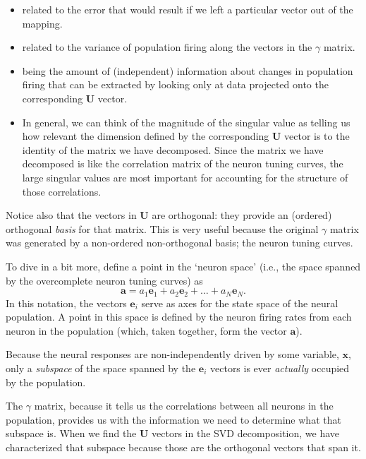 \documentclass[10pt,letterpaper,oneside]{article}
\begin{document}
\begin{itemize}
\item related to the error that would result if we left a particular vector
out of the mapping. 
\item related to the variance of population firing along the vectors in
the $\gamma$ matrix. 
\item being the amount of (independent) information about changes in population
firing that can be extracted by looking only at data projected onto
the corresponding $\mathbf{U}$ vector.
\item In general, we can think of the magnitude of the singular value as
telling us how relevant the dimension defined by the corresponding
$\mathbf{U}$ vector is to the identity of the matrix we have decomposed.
Since the matrix we have decomposed is like the correlation matrix
of the neuron tuning curves, the large singular values are most important
for accounting for the structure of those correlations. 
\end{itemize}

Notice also that the vectors in $\mathbf{U}$ are orthogonal: they
provide an (ordered) orthogonal \emph{basis} for that matrix. This
is very useful because the original \textbf{$\gamma$} matrix was
generated by a non-ordered non-orthogonal basis; the neuron tuning
curves. 

To dive in a bit more, define a point in the `neuron space' (i.e., the
space spanned by the overcomplete neuron tuning curves) as
\[
\mathbf{a}=a_{1}\mathbf{e}_{1}+a_{2}\mathbf{e}_{2}+\ldots+a_{N}\mathbf{e}_{N}.
\]
In this notation, the vectors $\mathbf{e}_{i}$ serve as axes for
the state space of the neural population. A point in this space is
defined by the neuron firing rates from each neuron in the population
(which, taken together, form the vector $\mathbf{a}$). 

Because the neural responses are non-independently driven by some
variable, $\mathbf{x}$, only a \emph{subspace} of the space spanned
by the $\mathbf{e}_{i}$ vectors is ever \emph{actually} occupied
by the population.

The $\gamma$ matrix, because it tells us the correlations between
all neurons in the population, provides us with the information we
need to determine what that subspace is. When we find the $\mathbf{U}$
vectors in the SVD decomposition, we have characterized that subspace
because those are the orthogonal vectors that span it. 
\end{document}
